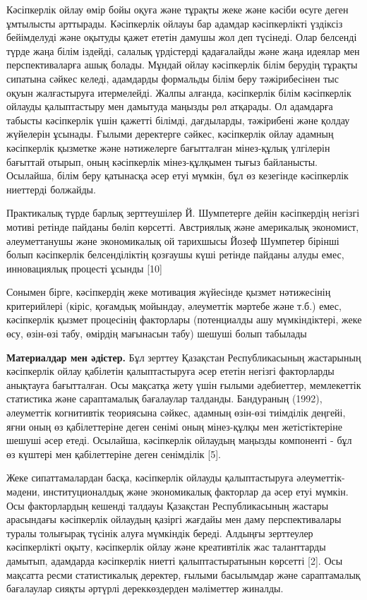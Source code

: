 \begin{multicols}{2}
Кәсіпкерлік ойлау өмір бойы оқуға және тұрақты жеке және кәсіби өсуге
деген ұмтылысты арттырады. Кәсіпкерлік ойлауы бар адамдар кәсіпкерлікті
үздіксіз бейімделуді және оқытуды қажет ететін дамушы жол деп түсінеді.
Олар белсенді түрде жаңа білім іздейді, салалық үрдістерді қадағалайды
және жаңа идеялар мен перспективаларға ашық болады. Мұндай ойлау
кәсіпкерлік білім берудің тұрақты сипатына сәйкес келеді, адамдарды
формальды білім беру тәжірибесінен тыс оқуын жалғастыруға итермелейді.
Жалпы алғанда, кәсіпкерлік білім кәсіпкерлік ойлауды қалыптастыру мен
дамытуда маңызды рөл атқарады. Ол адамдарға табысты кәсіпкерлік үшін
қажетті білімді, дағдыларды, тәжірибені және қолдау жүйелерін ұсынады.
Ғылыми деректерге сәйкес, кәсіпкерлік ойлау адамның кәсіпкерлік қызметке
және нәтижелерге бағытталған мінез-құлық үлгілерін бағыттай отырып, оның
кәсіпкерлік мінез-құлқымен тығыз байланысты. Осылайша, білім беру
қатынасқа әсер етуі мүмкін, бұл өз кезегінде кәсіпкерлік ниеттерді
болжайды.

Практикалық түрде барлық зерттеушілер Й. Шумпетерге дейін кәсіпкердің
негізгі мотиві ретінде пайданы бөліп көрсетті. Австриялық және
америкалық экономист, әлеуметтанушы және экономикалық ой тарихшысы Йозеф
Шумпетер бірінші болып кәсіпкерлік белсенділіктің қозғаушы күші ретінде
пайданы алуды емес, инновациялық процесті ұсынды {[}10{]}

Сонымен бірге, кәсіпкердің жеке мотивация жүйесінде қызмет нәтижесінің
критерийлері (кіріс, қоғамдық мойындау, әлеуметтік мәртебе және т.б.)
емес, кәсіпкерлік қызмет процесінің факторлары (потенциалды ашу
мүмкіндіктері, жеке өсу, өзін-өзі табу, өмірдің мағынасын табу) шешуші
болып табылады

{\bfseries Материалдар мен әдістер.} Бұл зерттеу Қазақстан Республикасының
жастарының кәсіпкерлік ойлау қабілетін қалыптастыруға әсер ететін
негізгі факторларды анықтауға бағытталған. Осы мақсатқа жету үшін ғылыми
әдебиеттер, мемлекеттік статистика және сараптамалық бағалаулар
талданды. Бандураның (1992), әлеуметтік когнитивтік теориясына сәйкес,
адамның өзін-өзі тиімділік деңгейі, яғни оның өз қабілеттеріне деген
сенімі оның мінез-құлқы мен жетістіктеріне шешуші әсер етеді. Осылайша,
кәсіпкерлік ойлаудың маңызды компоненті - бұл өз күштері мен
қабілеттеріне деген сенімділік {[}5{]}.

Жеке сипаттамалардан басқа, кәсіпкерлік ойлауды қалыптастыруға
әлеуметтік-мәдени, институционалдық және экономикалық факторлар да әсер
етуі мүмкін. Осы факторлардың кешенді талдауы Қазақстан Республикасының
жастары арасындағы кәсіпкерлік ойлаудың қазіргі жағдайы мен даму
перспективалары туралы толығырақ түсінік алуға мүмкіндік береді. Алдыңғы
зерттеулер кәсіпкерлікті оқыту, кәсіпкерлік ойлау және креативтілік жас
таланттарды дамытып, адамдарда кәсіпкерлік ниетті қалыптастыратынын
көрсетті {[}2{]}. Осы мақсатта ресми статистикалық деректер, ғылыми
басылымдар және сараптамалық бағалаулар сияқты әртүрлі дереккөздерден
мәліметтер жиналды.


\end{multicols}

